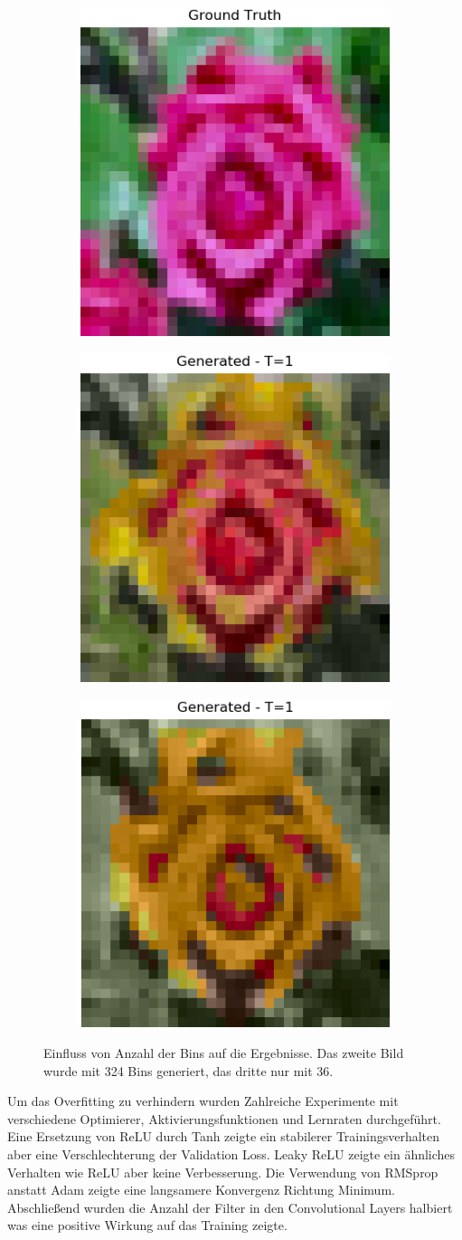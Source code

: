 \begin{figure}[H]
  \centering
  \vspace{1cm}
  \begin{subfigure}
    \centering
    \includegraphics[width=.24\textwidth]{resources/experiments/cifar/12_original.png}
  \end{subfigure}
  \begin{subfigure}
    \centering
    \includegraphics[width=.24\textwidth]{resources/experiments/cifar/12_t1.png}
  \end{subfigure}
  \begin{subfigure}
    \centering
    \includegraphics[width=.24\textwidth]{resources/experiments/cifar/12_t1_36.png}
  \end{subfigure}

  \caption{Einfluss von Anzahl der Bins auf die Ergebnisse. Das zweite Bild wurde mit 324 Bins generiert, das dritte nur mit 36.}
  \label{image:gute-ergebnisse-cifar}
\end{figure}

Um das Overfitting zu verhindern wurden Zahlreiche Experimente mit verschiedene Optimierer, Aktivierungsfunktionen und Lernraten durchgeführt.
Eine Ersetzung von ReLU durch Tanh zeigte ein stabilerer Trainingsverhalten aber eine Verschlechterung der Validation Loss. Leaky ReLU zeigte 
ein ähnliches Verhalten wie ReLU aber keine Verbesserung. Die Verwendung von RMSprop anstatt Adam zeigte eine langsamere Konvergenz Richtung Minimum.
Abschließend wurden die Anzahl der Filter in den Convolutional Layers halbiert was eine positive Wirkung auf das Training zeigte.   

